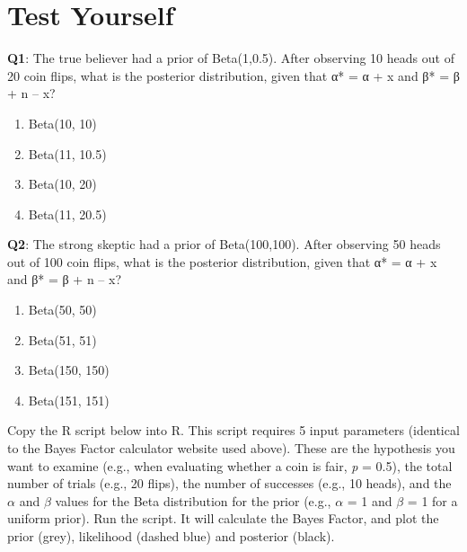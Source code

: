 \documentclass[
  oneside]{book}
\providecommand{\tightlist}{%
  \setlength{\itemsep}{0pt}\setlength{\parskip}{0pt}}
\begin{document}
\hypertarget{test-yourself-3}{%
\section{Test Yourself}\label{test-yourself-3}}

\textbf{Q1}: The true believer had a prior of Beta(1,0.5). After observing 10 heads out of 20 coin flips, what is the posterior distribution, given that α* = α + x and β* = β + n -- x?

\begin{enumerate}
\def\labelenumi{\Alph{enumi})}
\tightlist
\item
  Beta(10, 10)
\item
  Beta(11, 10.5)
\item
  Beta(10, 20)
\item
  Beta(11, 20.5)
\end{enumerate}

\textbf{Q2}: The strong skeptic had a prior of Beta(100,100). After observing 50 heads out of 100 coin flips, what is the posterior distribution, given that α* = α + x and β* = β + n -- x?

\begin{enumerate}
\def\labelenumi{\Alph{enumi})}
\tightlist
\item
  Beta(50, 50)
\item
  Beta(51, 51)
\item
  Beta(150, 150)
\item
  Beta(151, 151)
\end{enumerate}

Copy the R script below into R. This script requires 5 input parameters (identical to the Bayes Factor calculator website used above). These are the hypothesis you want to examine (e.g., when evaluating whether a coin is fair, \emph{p} = 0.5), the total number of trials (e.g., 20 flips), the number of successes (e.g., 10 heads), and the \(\alpha\) and \(\beta\) values for the Beta distribution for the prior (e.g., \(\alpha\) = 1 and \(\beta\) = 1 for a uniform prior). Run the script. It will calculate the Bayes Factor, and plot the prior (grey), likelihood (dashed blue) and posterior (black).
\end{document}
